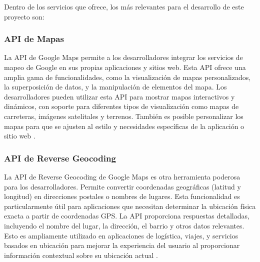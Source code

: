 Dentro de los servicios que ofrece, los más relevantes para el desarrollo de este
proyecto son:

\subsubsection{API de Mapas}

La API de Google Maps permite a los desarrolladores integrar los servicios de
mapeo de Google en sus propias aplicaciones y sitios web. Esta API ofrece una
amplia gama de funcionalidades, como la visualización de mapas personalizados,
la superposición de datos, y la manipulación de elementos del mapa. Los
desarrolladores pueden utilizar esta API para mostrar mapas interactivos y
dinámicos, con soporte para diferentes tipos de visualización como mapas de
carreteras, imágenes satelitales y terrenos. También es posible personalizar
los mapas para que se ajusten al estilo y necesidades específicas de la aplicación
o sitio web \cite{google_maps_platform_start}.

\subsubsection{API de Reverse Geocoding}

La API de Reverse Geocoding de Google Maps es otra herramienta poderosa para
los desarrolladores. Permite convertir coordenadas geográficas (latitud y longitud)
en direcciones postales o nombres de lugares. Esta funcionalidad es particularmente
útil para aplicaciones que necesitan determinar la ubicación física exacta a partir
de coordenadas GPS. La API proporciona respuestas detalladas, incluyendo el nombre
del lugar, la dirección, el barrio y otros datos relevantes. Esto es ampliamente
utilizado en aplicaciones de logística, viajes, y servicios basados en ubicación
para mejorar la experiencia del usuario al proporcionar información contextual
sobre su ubicación actual \cite{google_geocoding_2023}.


